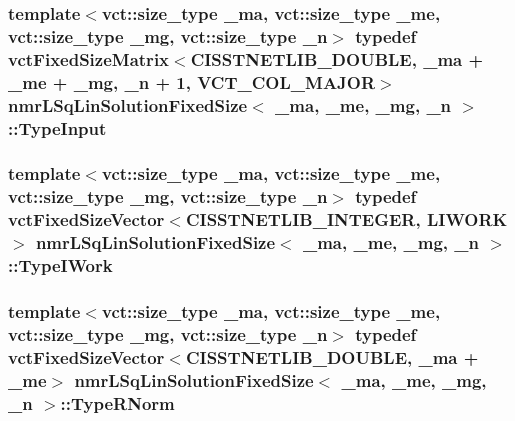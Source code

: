\hypertarget{classnmr_l_sq_lin_solution_fixed_size_adf9a982c0414dafb9fb1164b8da4f96f}{
\subsubsection[{Type\-Input}]{\setlength{\rightskip}{0pt plus 5cm}template$<$vct\-::size\-\_\-type \-\_\-ma, vct\-::size\-\_\-type \-\_\-me, vct\-::size\-\_\-type \-\_\-mg, vct\-::size\-\_\-type \-\_\-n$>$ typedef {\bf vct\-Fixed\-Size\-Matrix}$<$C\-I\-S\-S\-T\-N\-E\-T\-L\-I\-B\-\_\-\-D\-O\-U\-B\-L\-E, \-\_\-ma + \-\_\-me + \-\_\-mg, \-\_\-n + 1, {\bf V\-C\-T\-\_\-\-C\-O\-L\-\_\-\-M\-A\-J\-O\-R}$>$ {\bf nmr\-L\-Sq\-Lin\-Solution\-Fixed\-Size}$<$ \-\_\-ma, \-\_\-me, \-\_\-mg, \-\_\-n $>$\-::{\bf Type\-Input}}}\label{classnmr_l_sq_lin_solution_fixed_size_adf9a982c0414dafb9fb1164b8da4f96f}
\hypertarget{classnmr_l_sq_lin_solution_fixed_size_a1838601b0a3e6fa7972e8854b888152a}{
\subsubsection[{Type\-I\-Work}]{\setlength{\rightskip}{0pt plus 5cm}template$<$vct\-::size\-\_\-type \-\_\-ma, vct\-::size\-\_\-type \-\_\-me, vct\-::size\-\_\-type \-\_\-mg, vct\-::size\-\_\-type \-\_\-n$>$ typedef {\bf vct\-Fixed\-Size\-Vector}$<$C\-I\-S\-S\-T\-N\-E\-T\-L\-I\-B\-\_\-\-I\-N\-T\-E\-G\-E\-R, {\bf L\-I\-W\-O\-R\-K}$>$ {\bf nmr\-L\-Sq\-Lin\-Solution\-Fixed\-Size}$<$ \-\_\-ma, \-\_\-me, \-\_\-mg, \-\_\-n $>$\-::{\bf Type\-I\-Work}}}\label{classnmr_l_sq_lin_solution_fixed_size_a1838601b0a3e6fa7972e8854b888152a}
\hypertarget{classnmr_l_sq_lin_solution_fixed_size_a384dc1235386018c6edbdc782c5f84be}{
\subsubsection[{Type\-R\-Norm}]{\setlength{\rightskip}{0pt plus 5cm}template$<$vct\-::size\-\_\-type \-\_\-ma, vct\-::size\-\_\-type \-\_\-me, vct\-::size\-\_\-type \-\_\-mg, vct\-::size\-\_\-type \-\_\-n$>$ typedef {\bf vct\-Fixed\-Size\-Vector}$<$C\-I\-S\-S\-T\-N\-E\-T\-L\-I\-B\-\_\-\-D\-O\-U\-B\-L\-E, \-\_\-ma + \-\_\-me$>$ {\bf nmr\-L\-Sq\-Lin\-Solution\-Fixed\-Size}$<$ \-\_\-ma, \-\_\-me, \-\_\-mg, \-\_\-n $>$\-::{\bf Type\-R\-Norm}}}\label{classnmr_l_sq_lin_solution_fixed_size_a384dc1235386018c6edbdc782c5f84be}
